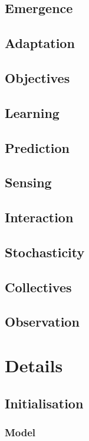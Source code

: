 \subsection{Emergence}
\subsection{Adaptation}
\subsection{Objectives}
\subsection{Learning}
\subsection{Prediction}
\subsection{Sensing}
\subsection{Interaction}
\subsection{Stochasticity}
\subsection{Collectives}
\subsection{Observation}



\section{Details}

\subsection{Initialisation}

\subsubsection{Model}

